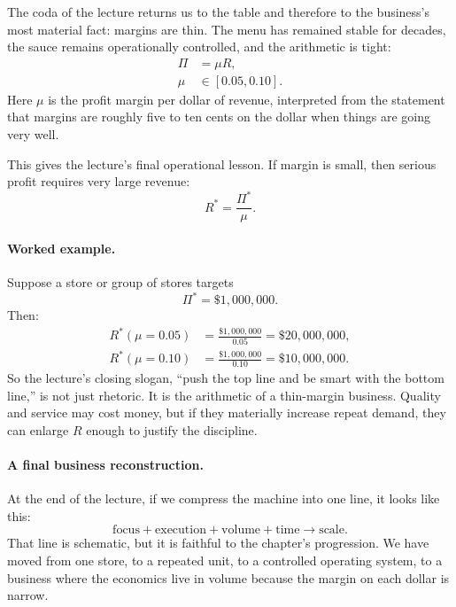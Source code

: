 The coda of the lecture returns us to the table and therefore to the business's most material fact: margins are thin. The menu has remained stable for decades, the sauce remains operationally controlled, and the arithmetic is tight:
\begin{align}
\Pi &= \mu R,\\
\mu &\in [0.05,0.10].
\end{align}
Here \(\mu\) is the profit margin per dollar of revenue, interpreted from the statement that margins are roughly five to ten cents on the dollar when things are going very well.

This gives the lecture's final operational lesson. If margin is small, then serious profit requires very large revenue:
\begin{equation}
R^* = \frac{\Pi^*}{\mu}.
\end{equation}

\paragraph{Worked example.}
Suppose a store or group of stores targets
\[
\Pi^* = \$1{,}000{,}000.
\]
Then:
\begin{align}
R^*(\mu=0.05) &= \frac{\$1{,}000{,}000}{0.05} = \$20{,}000{,}000,\\
R^*(\mu=0.10) &= \frac{\$1{,}000{,}000}{0.10} = \$10{,}000{,}000.
\end{align}
So the lecture's closing slogan, ``push the top line and be smart with the bottom line,'' is not just rhetoric. It is the arithmetic of a thin-margin business. Quality and service may cost money, but if they materially increase repeat demand, they can enlarge \(R\) enough to justify the discipline.

\paragraph{A final business reconstruction.}
At the end of the lecture, if we compress the machine into one line, it looks like this:
\begin{equation}
\text{focus} + \text{execution} + \text{volume} + \text{time} \longrightarrow \text{scale}.
\end{equation}
That line is schematic, but it is faithful to the chapter's progression. We have moved from one store, to a repeated unit, to a controlled operating system, to a business where the economics live in volume because the margin on each dollar is narrow.


